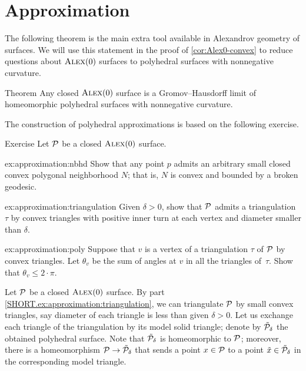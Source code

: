 \section{Approximation}

The following theorem is the main extra tool available in Alexandrov geometry of surfaces.
We will use this statement in the proof of \ref{cor:Alex0-convex} to reduce questions about $\textsc{Alex}(0)$ surfaces to polyhedral surfaces with nonnegative curvature.

\begin{thm}{Theorem}\label{thm:approximation}
Any closed $\textsc{Alex}(0)$ surface is a Gromov--Hausdorff limit of homeomorphic polyhedral surfaces with nonnegative curvature.
\end{thm}

The construction of polyhedral approximations is based on the following exercise.

\begin{thm}{Exercise}\label{ex:construction}
Let $\mathcal{P}$ be a closed $\textsc{Alex}(0)$ surface.

\begin{subthm}{ex:approximation:nbhd}
Show that any point $p$ admits an arbitrary small closed convex polygonal neighborhood $N$;
that is, $N$ is convex and bounded by a broken geodesic.

\end{subthm}

\begin{subthm}{ex:approximation:triangulation}
Given $\delta>0$, show that $\mathcal{P}$ admits a triangulation $\tau$ by convex triangles
with positive inner turn at each vertex and diameter smaller than $\delta$.
\end{subthm}

\begin{subthm}{ex:approximation:poly}
Suppose that $v$ is a vertex of a triangulation $\tau$ of $\mathcal{P}$ by convex triangles.
Let $\theta_v$ be the sum of angles at $v$ in all the triangles of~$\tau$.
Show that $\theta_v\le 2\cdot\pi$.
\end{subthm}

\end{thm}

Let $\mathcal{P}$ be a closed $\textsc{Alex}(0)$ surface.
By part \ref{SHORT.ex:approximation:triangulation}, we can triangulate $\mathcal{P}$ by small convex triangles, say diameter of each triangle is less than given $\delta>0$.
Let us exchange each triangle of the triangulation by its model solid triangle; denote by $\tilde {\mathcal{P}}_\delta$ the obtained polyhedral surface.
Note that $\tilde {\mathcal{P}}_\delta$ is homeomorphic to $\mathcal{P}$;
moreover, there is a homeomorphism $\mathcal{P}\to \tilde {\mathcal{P}}_\delta$ that sends a point $x\in \mathcal{P}$ to a point $\tilde x\in \tilde {\mathcal{P}}_\delta$ in the corresponding model triangle.

